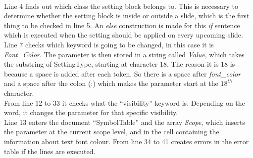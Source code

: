  \\
Line 4 finds out which class the setting block belongs to. This is necessary to determine whether the setting block is inside or outside a slide, which is the first thing to be checked in line 5. An \textit{else} construction is made for this \textit{if} sentence which is executed when the setting should be applied on every upcoming slide.\\
Line 7 checks which keyword is going to be changed, in this case it is \textit{Font\_Color}. The parameter is then stored in a string called \textit{Value}, which takes the substring of SettingType, starting at character 18. The reason it is 18 is because a space is added after each token. So there is a space after \textit{font\_color} and a space after the colon (:) which makes the parameter start at the $18^{th}$ character.\\
From line 12 to 33 it checks what the ``visibility'' keyword is. Depending on the word, it changes the parameter for that specific visibility.\\
Line 13 enters the document ``SymbolTable'' and the array \textit{Scope}, which inserts the parameter at the current scope level, and in the cell containing the information about text font colour.
From line 34 to 41 creates errors in the error table if the lines are executed.

